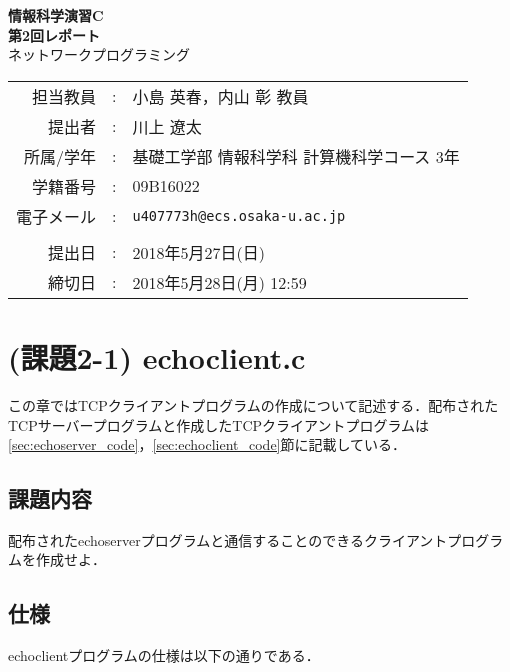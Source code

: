 \documentclass[a4j]{jarticle}
\makeatletter
\newcommand{\esp}{echoserverプログラム}
\newcommand{\ecp}{echoclientプログラム}
\newcommand{\lectureName}{情報科学演習C}
\newcommand{\reportNumber}{2}
\newcommand{\reportTitle}{ネットワークプログラミング}
\newcommand{\teacherName}{小島 英春，内山 彰 教員}
\newcommand{\deadline}{2018年5月28日(月)  12:59}
\newcommand{\studentName}{川上 遼太}
\newcommand{\studentAff}{基礎工学部 情報科学科 計算機科学コース 3年}
\newcommand{\studentID}{09B16022}
\newcommand{\studentEmail}{u407773h@ecs.osaka-u.ac.jp}
\newcommand{\submitted}{2018年5月27日(日)}
\makeatother
\begin{document}
\begin{titlepage}
\mbox{\vspace{10cm}}

\begin{center}
{\Huge\bfseries
\lectureName \\
第\reportNumber{}回レポート} \\
\vspace{1cm}
{\Large \reportTitle}
\vspace{5cm}

{\large
\begin{tabular}{rcl}
担当教員 & : & \teacherName \\
提出者   & : & \studentName \\
所属/学年   & : & \studentAff\\
学籍番号 & : & \studentID \\
電子メール & : & \texttt{\studentEmail}\\
\\
提出日 & : & \submitted \\
締切日 & : & \deadline
\end{tabular}
}
\end{center}
\end{titlepage}

\tableofcontents
\newpage

\section{(課題2-1) echoclient.c}

この章ではTCPクライアントプログラムの作成について記述する．配布されたTCPサーバープログラムと作成したTCPクライアントプログラムは\ref{sec:echoserver_code}，\ref{sec:echoclient_code}節に記載している．

\subsection{課題内容}

配布された\esp と通信することのできるクライアントプログラムを作成せよ．

\subsection{仕様}
\label{sec:echo_shiyo}

\ecp の仕様は以下の通りである．
\end{document}
